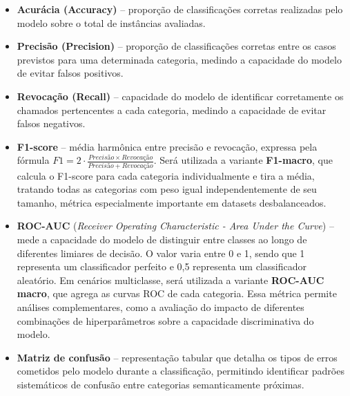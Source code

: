 \documentclass[
    12pt,                %
    openright,           %
    oneside,             %
    a4paper,             %
    english,             %
    brazil               %
]{abntex2}
\begin{document}
\begin{itemize}
\item \textbf{Acurácia (Accuracy)} – proporção de classificações corretas 
realizadas pelo modelo sobre o total de instâncias avaliadas.

\item \textbf{Precisão (Precision)} – proporção de classificações corretas 
entre os casos previstos para uma determinada categoria, medindo a 
capacidade do modelo de evitar falsos positivos.

\item \textbf{Revocação (Recall)} – capacidade do modelo de identificar 
corretamente os chamados pertencentes a cada categoria, medindo a 
capacidade de evitar falsos negativos.

\item \textbf{F1-score} – média harmônica entre precisão e revocação, 
expressa pela fórmula $F1 = 2 \cdot \frac{Precisão \times Revocação}{Precisão 
+ Revocação}$. Será utilizada a variante \textbf{F1-macro}, que calcula o 
F1-score para cada categoria individualmente e tira a média, tratando todas 
as categorias com peso igual independentemente de seu tamanho, métrica 
especialmente importante em datasets desbalanceados.

\item \textbf{ROC-AUC} (\textit{Receiver Operating Characteristic - Area 
Under the Curve}) – mede a capacidade do modelo de distinguir entre classes 
ao longo de diferentes limiares de decisão. O valor varia entre 0 e 1, sendo 
que 1 representa um classificador perfeito e 0,5 representa um classificador 
aleatório. Em cenários multiclasse, será utilizada a variante 
\textbf{ROC-AUC macro}, que agrega as curvas ROC de cada categoria. Essa 
métrica permite análises complementares, como a avaliação do impacto de 
diferentes combinações de hiperparâmetros sobre a capacidade discriminativa 
do modelo.

\item \textbf{Matriz de confusão} – representação tabular que detalha os 
tipos de erros cometidos pelo modelo durante a classificação, permitindo 
identificar padrões sistemáticos de confusão entre categorias semanticamente 
próximas.
\end{itemize}

\end{document}

